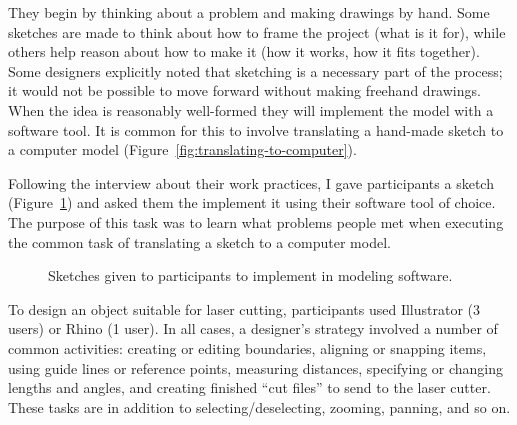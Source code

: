 \documentclass[12pt]{article}
\begin{document}
They begin by thinking about a problem and making drawings by
hand. Some sketches are made to think about how to frame the project
(what is it for), while others help reason about how to make it (how
it works, how it fits together). Some designers explicitly noted that
sketching is a necessary part of the process; it would not be possible
to move forward without making freehand drawings. When the idea is
reasonably well-formed they will implement the model with a software
tool. It is common for this to involve translating a hand-made sketch
to a computer model (Figure~\ref{fig:translating-to-computer}). 

Following the interview about their work practices, I gave
participants a sketch (Figure~\ref{fig:interview-sketch}) and asked
them the implement it using their software tool of choice. The purpose
of this task was to learn what problems people met when executing the
common task of translating a sketch to a computer model.

\begin{figure}[h]
\centering 
{}
\hspace{1cm} 
\caption{Sketches given to participants to implement in modeling software.}
\label{fig:interview-sketch}
\end{figure}

To design an object suitable for laser cutting, participants used
Illustrator (3 users) or Rhino (1 user). In all cases, a designer's
strategy involved a number of common activities: creating or editing
boundaries, aligning or snapping items, using guide lines or reference
points, measuring distances, specifying or changing lengths and
angles, and creating finished ``cut files'' to send to the laser
cutter. These tasks are in addition to selecting/deselecting, zooming,
panning, and so on.
\end{document}
